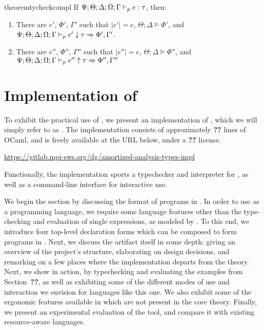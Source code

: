 \begin{restatable}{theorem}{tycheckcompl}
\label{thm:tycheck-compl}
If $\Psi;\Theta;\Delta;\Omega;\Gamma \vdash_p e : \tau$, then:
\begin{enumerate}
  \item There are $e'$, $\Phi'$, $\Gamma'$ such that $|e'| = e$, $\Theta ; \Delta \vDash \Phi'$, and $\Psi;\Theta;\Delta;\Omega;\Gamma \vdash_p e' \downarrow \tau \Rightarrow \Phi', \Gamma'$.
  \item There are $e''$, $\Phi''$, $\Gamma''$ such that $|e''| = e$, $\Theta ; \Delta \vDash \Phi''$, and $\Psi;\Theta;\Delta;\Omega;\Gamma \vdash_p e'' \uparrow \tau \Rightarrow \Phi'',\Gamma''$
\end{enumerate}
\end{restatable}


\section{Implementation of \lambdaamor}
\label{sec:lambdaamor-impl}
To exhibit the practical use of \dlambdaamor, we present an implementation of \bilambdaamor, which we will simply refer to as \lambdaamorimpl. The implementation consists of approximately \textbf{??} lines of OCaml, and is freely available at the URL below, under a \textbf{??} license.
\begin{center}
\url{https://gitlab.mpi-sws.org/dg/amortized-analysis-types-impl}
\end{center}
Functionally, the implementation sports a typechecker and interpreter for \dlambdaamor, as well as a command-line interface for interactive use.

We begin the section by discussing the format of programs in \lambdaamorimpl. In order to use \lambdaamorimpl as a programming language, we require some language features other than the type-checking and evaluation of single expressions, as modeled by \bilambdaamor. To this end, we introduce four top-level declaration forms which can be composed to form programs in \lambdaamorimpl. Next, we discuss the artifact itself in some depth: giving an overview of the project's structure, elaborating on design decisions, and remarking on a few places where the implementation departs from the theory.
 Next, we show \lambdaamorimpl in action, by typechecking and evaluating the examples from Section~\textbf{??}, as well as exhibiting some of the different modes of use and interaction we envision for languages like this one. We also exhibit some of the ergonomic features available in \lambdaamorimpl which are not present in the core theory. Finally, we present an experimental evaluation of the tool, and compare it with existing resource-aware languages.
 

